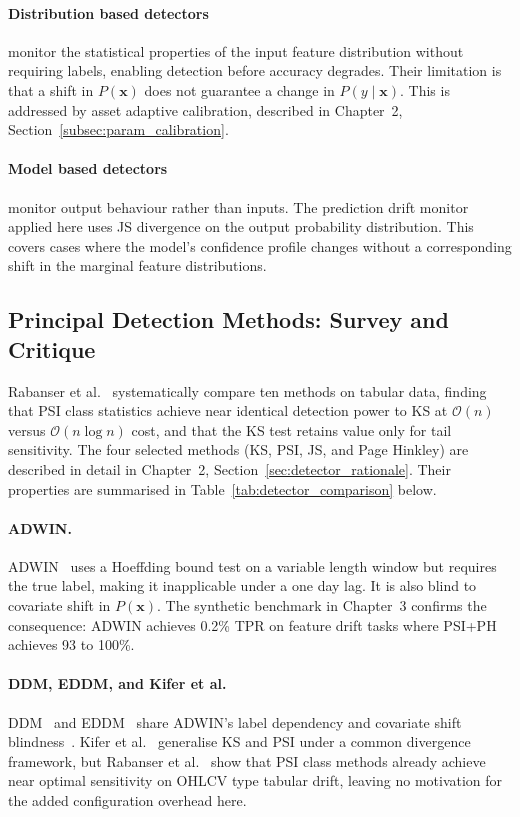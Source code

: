 \paragraph{Distribution based detectors} monitor the statistical properties of the input feature distribution without requiring labels, enabling detection before accuracy degrades. Their limitation is that a shift in $P(\mathbf{x})$ does not guarantee a change in $P(y \mid \mathbf{x})$. This is addressed by asset adaptive calibration, described in Chapter~2, Section~\ref{subsec:param_calibration}.

\paragraph{Model based detectors} monitor output behaviour rather than inputs. The prediction drift monitor applied here uses JS divergence on the output probability distribution. This covers cases where the model's confidence profile changes without a corresponding shift in the marginal feature distributions.

\subsection{Principal Detection Methods: Survey and Critique}

Rabanser et al.~\cite{rabanser2019} systematically compare ten methods on tabular data, finding that PSI class statistics achieve near identical detection power to KS at $\mathcal{O}(n)$ versus $\mathcal{O}(n \log n)$ cost, and that the KS test retains value only for tail sensitivity. The four selected methods (KS, PSI, JS, and Page Hinkley) are described in detail in Chapter~2, Section~\ref{sec:detector_rationale}. Their properties are summarised in Table~\ref{tab:detector_comparison} below.

\paragraph{ADWIN.}
ADWIN~\cite{bifet2007adwin} uses a Hoeffding bound test on a variable length window but requires the true label, making it inapplicable under a one day lag. It is also blind to covariate shift in $P(\mathbf{x})$. The synthetic benchmark in Chapter~3 confirms the consequence: ADWIN achieves 0.2\% TPR on feature drift tasks where PSI+PH achieves 93 to 100\%.

\paragraph{DDM, EDDM, and Kifer et al.}
DDM~\cite{gama2004ddm} and EDDM~\cite{baenagarcia2006eddm} share ADWIN's label dependency and covariate shift blindness~\cite{nishida2007}. Kifer et al.~\cite{kifer2004} generalise KS and PSI under a common divergence framework, but Rabanser et al.~\cite{rabanser2019} show that PSI class methods already achieve near optimal sensitivity on OHLCV type tabular drift, leaving no motivation for the added configuration overhead here.


